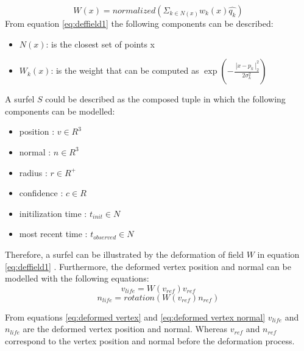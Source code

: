 \documentclass[12pt]{report}
\begin{document}
\begin{equation}  
  W(x)=normalized(\Sigma_{k \in N(x)} w_{k}(x) \hat{q_k})
  \label{eq:deffield1}
\end{equation}
From equation \ref{eq:deffield1} the following components can be described:
\begin{itemize}
  \item $N(x)$: is the closest set of points x
  \item $W_{k}(x)$:  is the weight that can be computed as $\exp{(-\frac{\ | {x-p_k} \ |^{2}_2 }{2\sigma^{2}_k})}$
\end{itemize}

A surfel $S$ could be described as the composed tuple in which the following components can be modelled:
\begin{itemize}
  \item position : $v \in R^3$ 
  \item  normal  : $n \in R^3$
  \item  radius : $r \in R^+$
  \item confidence : $c \in R$
  \item initilization time : $t_{init} \in N$
  \item most recent time : $t_{observed} \in N$ 
\end{itemize}
Therefore, a surfel can be illustrated by the deformation of field $W$ in equation \ref{eq:deffield1} \citep{SurfelWarp}.
Furthermore, the deformed vertex position  and normal can be modelled with the following equations:
\begin{equation}
  v_{life}=W(v_{ref})v_{ref}
  \label{eq:deformed vertex}
\end{equation}
\begin{equation}
  n_{life}=rotation(W(v_{ref})n_{ref})
  \label{eq:deformed vertex normal}
\end{equation}

From equations \ref{eq:deformed vertex} and \ref{eq:deformed vertex normal} $v_{life}$ and $n_{life}$ are the deformed vertex position and normal.
Whereas $v_{ref}$ and $n_{ref}$ correspond to the vertex position and normal before the deformation process. 
\end{document}
